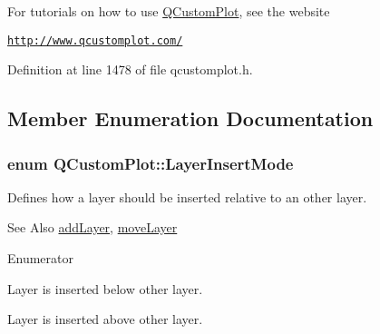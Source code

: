 For tutorials on how to use \hyperlink{class_q_custom_plot}{Q\-Custom\-Plot}, see the website\par
 \href{http://www.qcustomplot.com/}{\tt http\-://www.\-qcustomplot.\-com/} 

Definition at line 1478 of file qcustomplot.\-h.



\subsection{Member Enumeration Documentation}
\hypertarget{class_q_custom_plot_a75a8afbe6ef333b1f3d47abb25b9add7}{
\subsubsection[{Layer\-Insert\-Mode}]{\setlength{\rightskip}{0pt plus 5cm}enum {\bf Q\-Custom\-Plot\-::\-Layer\-Insert\-Mode}}}\label{class_q_custom_plot_a75a8afbe6ef333b1f3d47abb25b9add7}
Defines how a layer should be inserted relative to an other layer.

\begin{DoxySeeAlso}{See Also}
\hyperlink{class_q_custom_plot_ad5255393df078448bb6ac83fa5db5f52}{add\-Layer}, \hyperlink{class_q_custom_plot_ae896140beff19424e9e9e02d6e331104}{move\-Layer} 
\end{DoxySeeAlso}
\begin{Desc}
\item[Enumerator]\par
\begin{description}
\item[{\em 
\hypertarget{class_q_custom_plot_a75a8afbe6ef333b1f3d47abb25b9add7aee39cf650cd24e68552da0b697ce4a93}{lim\-Below}\label{class_q_custom_plot_a75a8afbe6ef333b1f3d47abb25b9add7aee39cf650cd24e68552da0b697ce4a93}
}]Layer is inserted below other layer. \item[{\em 
\hypertarget{class_q_custom_plot_a75a8afbe6ef333b1f3d47abb25b9add7a062b0b7825650b432a713c0df6742d41}{lim\-Above}\label{class_q_custom_plot_a75a8afbe6ef333b1f3d47abb25b9add7a062b0b7825650b432a713c0df6742d41}
}]Layer is inserted above other layer. \end{description}
\end{Desc}


